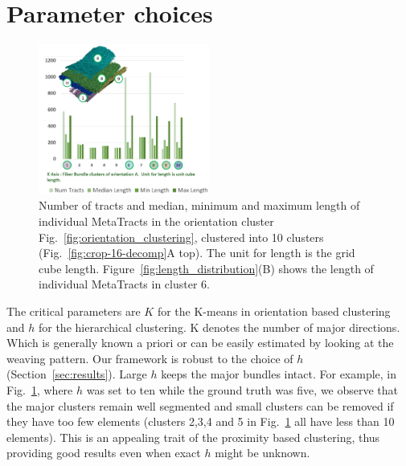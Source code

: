 \section{Parameter choices}
\label{sec:param_choices}
\begin{figure}
\centering
	\includegraphics[width=0.5\textwidth]{imagesMT2014/crop-16/histogram_10_A.PNG}
	\caption{Number of tracts and median, minimum and maximum length of individual MetaTracts in the orientation cluster Fig.~\ref{fig:orientation_clustering}, clustered into 10 clusters (Fig.~\ref{fig:crop-16-decomp}A top). The unit for length is the grid cube length. Figure~\ref{fig:length_distribution}(B) shows the length of individual MetaTracts in cluster 6.}
	\label{fig:len_dist_crop16}
\end{figure}
The critical parameters are $K$ for the K-means in orientation based clustering and $h$ for the hierarchical clustering. K denotes the number of major directions. Which is generally known a priori or can be easily estimated by looking at the weaving pattern. 
Our framework is robust to the choice of $h$ (Section~\ref{sec:results}). Large $h$ keeps the major bundles intact. For example, in  Fig.~\ref{fig:len_dist_crop16}, where $h$ was set to ten while the ground truth was five, we observe that the major clusters remain well segmented and small clusters can be removed if they have too few elements (clusters 2,3,4 and 5 in Fig.~\ref{fig:len_dist_crop16} all have less than 10 elements). This is an appealing trait of the proximity based clustering, thus providing good results even when exact $h$ might be unknown.

